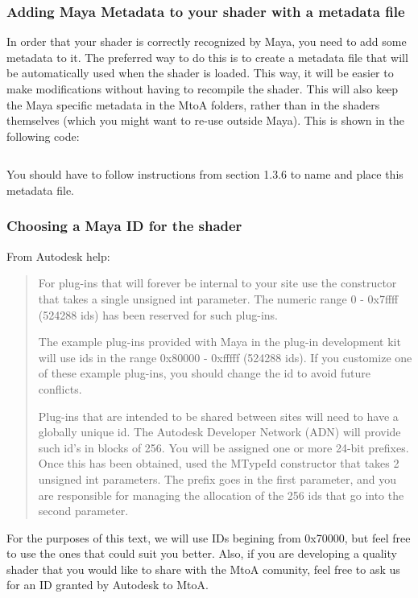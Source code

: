 \subsubsection{Adding Maya Metadata to your shader with a metadata file}
In order that your shader is correctly recognized by Maya, you need to add some metadata to it.
The preferred way to do this is to create a metadata file that will be automatically used when the shader is loaded.
This way, it will be easier to make modifications without having to recompile the shader.
This will also keep the Maya specific metadata in the MtoA folders, rather than in the shaders themselves (which you might want to re-use outside Maya).
This is shown in the following code:

\inputminted[mathescape,
linenos,
numbersep=5pt,
frame=lines,
framesep=2mm,
baselinestretch=1,
fontsize=\footnotesize,
tabsize=3,
label=simpleShader.mtd]
{mtd}{simpleShader.mtd}

You should have to follow instructions from section 1.3.6 to name and place this metadata file.


\subsubsection{Choosing a Maya ID for the shader}

From Autodesk help:

\begin{quotation}
For plug-ins that will forever be internal to your site use the
constructor that takes a single unsigned int parameter. The numeric
range 0 - 0x7ffff (524288 ids) has been reserved for such plug-ins.

The example plug-ins provided with Maya in the plug-in development kit
will use ids in the range 0x80000 - 0xfffff (524288 ids). If you
customize one of these example plug-ins, you should change the id to
avoid future conflicts.

Plug-ins that are intended to be shared between sites will need to
have a globally unique id. The Autodesk Developer Network (ADN) will
provide such id's in blocks of 256. You will be assigned one or more
24-bit prefixes. Once this has been obtained, used the MTypeId
constructor that takes 2 unsigned int parameters. The prefix goes in
the first parameter, and you are responsible for managing the
allocation of the 256 ids that go into the second parameter.
\end{quotation}

For the purposes of this text, we will use IDs begining from 0x70000, but feel free to use the ones that could suit you better.
Also, if you are developing a quality shader that you would like to share with the MtoA comunity, feel free to ask us for an ID granted by Autodesk to MtoA.

